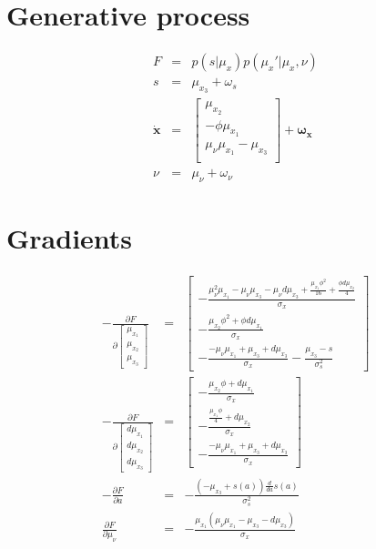 \documentclass[a4paper]{report}
\begin{document}
\section*{Generative process}

\begin{eqnarray}
  F&=&p(s|\mu_x)p(\mu_x'|\mu_x,\nu)\nonumber\\
  s &=& \mu_{x_3} + \omega_s \nonumber \\
  \dot{\mathbf{x}} &=&
  \left[\begin{array}{c}
  \mu_{x_2} \\
  -\phi\mu_{x_1} \\
  \mu_{\nu}\mu_{x_1} - \mu_{x_3} \\
  \end{array}\right] +\boldsymbol{\omega_x}\nonumber \\
  \nu &=& \mu_{\nu} + \omega_{\nu} \nonumber
\end{eqnarray}

\section*{Gradients}
\begin{eqnarray}
- \frac{\partial F}{\partial
  \left[\begin{matrix}\mu_{x_1}\\\mu_{x_2}\\\mu_{x_3}\end{matrix}\right]} &=&
  \left[\begin{matrix}- \frac{\mu_{\nu}^{2} \mu_{x_1} - \mu_{\nu} \mu_{x_3} -
  \mu_{\nu} d\mu_{x_3} + \frac{\mu_{x_1} \phi^{2}}{16} + \frac{\phi
  d\mu_{x_2}}{4}}{\sigma_x}\\- \frac{\mu_{x_2} \phi^{2} + \phi
  d\mu_{x_1}}{\sigma_x}\\- \frac{- \mu_{\nu} \mu_{x_1} + \mu_{x_3} +
  d\mu_{x_3}}{\sigma_x} - \frac{\mu_{x_3} - s}{\sigma_s^{2}}\end{matrix}\right]
  \nonumber \\
   - \frac{\partial F}{\partial
     \left[\begin{matrix}d\mu_{x_1}\\d\mu_{x_2}\\d\mu_{x_3}\end{matrix}\right]}
     &=& \left[\begin{matrix}- \frac{\mu_{x_2} \phi + d\mu_{x_1}}{\sigma_x}\\-
     \frac{\frac{\mu_{x_1} \phi}{4} + d\mu_{x_2}}{\sigma_x}\\- \frac{- \mu_{\nu}
     \mu_{x_1} + \mu_{x_3} + d\mu_{x_3}}{\sigma_x}\end{matrix}\right]\nonumber\\
  - \frac{\partial F}{\partial a} &=& - \frac{\left(- \mu_{x_3} + s{\left(a
    \right)}\right) \frac{d}{d a} s{\left(a \right)}}{\sigma_s^{2}} \nonumber \\
    \frac{\partial F}{\partial\mu_{\nu}} &=& - \frac{\mu_{x_1} \left(\mu_{\nu}
    \mu_{x_1} - \mu_{x_3} - d\mu_{x_3}\right)}{\sigma_x}
\end{eqnarray}
\end{document}
